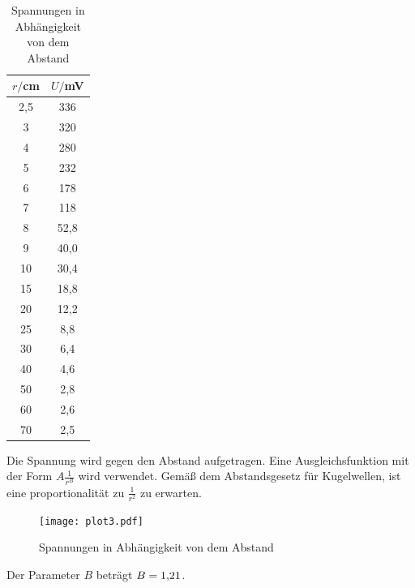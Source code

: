 \begin{table}[H]
  \centering
  \caption{Spannungen in Abhängigkeit von dem Abstand}
  \label{tab:Phase}
  \begin{tabular}{c c}
    \toprule
    $r/$cm  &  $U/$mV \\
    \midrule
     2,5   &    336    \\
     3     &    320    \\
     4     &    280    \\
     5     &    232    \\
     6     &    178    \\
     7     &    118    \\
     8     &    52,8    \\
     9     &    40,0    \\
    10     &    30,4    \\
    15     &    18,8    \\
    20     &    12,2    \\
    25     &    8,8     \\
    30     &    6,4     \\
    40     &    4,6     \\
    50     &    2,8     \\
    60     &    2,6     \\
    70     &    2,5     \\
    \bottomrule
  \end{tabular}
\end{table}

Die Spannung wird gegen den Abstand aufgetragen. Eine Ausgleichsfunktion mit der Form $A \frac{1}{r^B}$ wird verwendet. Gemäß dem
Abstandsgesetz für Kugelwellen, ist eine proportionalität zu $\frac{1}{r^2}$ zu erwarten.

\begin{figure}[H]
  \centering
  \texttt{[image: plot3.pdf]}
  \caption{Spannungen in Abhängigkeit von dem Abstand}
  \label{fig:plot3}
\end{figure}

Der Parameter $B$ beträgt $B= \SI{1.2{1}}{}$.
